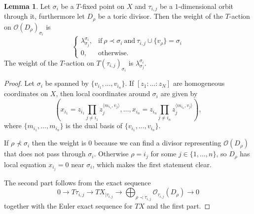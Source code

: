\documentclass[11pt]{amsart}
\renewcommand{\to}{\rightarrow}
\theoremstyle{definition}
\newtheorem{lem}[thm]{Lemma}
\theoremstyle{definition}
\begin{document}
\begin{lem}
 Let $\sigma_i$ be a $T$-fixed point on $X$ and $\tau_{i,j}$ be a $1$-dimensional orbit through it, furthermore let $D_\rho$ be a toric divisor. Then the weight of the $T$-action on $\mathcal O(D_\rho)_{\sigma_i}$ is
 \[
  \begin{cases}
      \lambda^{\sigma_i}_{\sigma_j}, & \text{if}\ \rho\prec \sigma_i\  \text{and}\  \tau_{i,j}\cup\{v_\rho\}=\sigma_i \\
      0, & \text{otherwise.}
    \end{cases}
 \]
The weight of the $T$-action on $T(\tau_{i,j})_{\sigma_i}$ is $\lambda^{\sigma_i}_{\sigma_j}$.
\end{lem}
\begin{proof}
 Let $\sigma_i$ be spanned by $\{v_{i_1},\ldots,v_{i_n}\}$. If $[z_1:\ldots:z_N]$ are homogeneous coordinates on $X$, then local coordinates around $\sigma_i$ are given by \[\left(x_{i_1}=z_{i_1}\prod_{j\neq i_1}z_j^{\langle m_{i_1},v_j\rangle},\ldots,x_{i_n}=z_{i_n}\prod_{j\neq i_n}z_j^{\langle m_{i_n},v_j\rangle}\right),\] where $\{m_{i_1},\ldots,m_{i_n}\}$ is the dual basis of $\{v_{i_1},\ldots,v_{i_n}\}$.
 
 If $\rho\nprec \sigma_i$ then the weight is $0$ because we can find a divisor representing $\mathcal O(D_\rho)$ that does not pass through $\sigma_i$. Otherwise $\rho=i_j$ for some $j\in\{1,\ldots,n\}$, so $D_{\rho}$ has local equation $x_{i_j}=0$ near $\sigma_i$, which makes the first statement clear.
 
 The second part follows from the exact sequence
 \[
  0\to T\tau_{i,j}\to TX_{|\tau_{i,j}}\to \bigoplus_{\rho\prec\tau_{i,j}}\mathcal O_{\tau_{i,j}}(D_{\rho})\to 0
 \]
together with the Euler exact sequence for $TX$ and the first part.
\end{proof}
\end{document}
